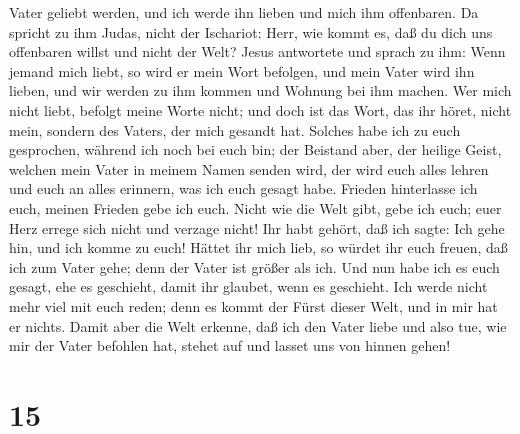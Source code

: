 Vater geliebt werden, und ich werde ihn lieben und mich ihm offenbaren.
 Da spricht zu ihm Judas, nicht der Ischariot: Herr, wie
kommt es, daß du dich uns offenbaren willst und nicht der Welt?
 Jesus antwortete und sprach zu ihm: Wenn jemand mich
liebt, so wird er mein Wort befolgen, und mein Vater wird ihn lieben,
und wir werden zu ihm kommen und Wohnung bei ihm machen. 
Wer mich nicht liebt, befolgt meine Worte nicht; und doch ist das Wort,
das ihr höret, nicht mein, sondern des Vaters, der mich gesandt hat.
 Solches habe ich zu euch gesprochen, während ich noch
bei euch bin;  der Beistand aber, der heilige Geist,
welchen mein Vater in meinem Namen senden wird, der wird euch alles
lehren und euch an alles erinnern, was ich euch gesagt habe.
 Frieden hinterlasse ich euch, meinen Frieden gebe ich
euch. Nicht wie die Welt gibt, gebe ich euch; euer Herz errege sich
nicht und verzage nicht!  Ihr habt gehört, daß ich sagte:
Ich gehe hin, und ich komme zu euch! Hättet ihr mich lieb, so würdet ihr
euch freuen, daß ich zum Vater gehe; denn der Vater ist größer als ich.
 Und nun habe ich es euch gesagt, ehe es geschieht, damit
ihr glaubet, wenn es geschieht.  Ich werde nicht mehr
viel mit euch reden; denn es kommt der Fürst dieser Welt, und in mir hat
er nichts.  Damit aber die Welt erkenne, daß ich den
Vater liebe und also tue, wie mir der Vater befohlen hat, stehet auf und
lasset uns von hinnen gehen!

\hypertarget{section-14}{%
\section{15}\label{section-14}}

